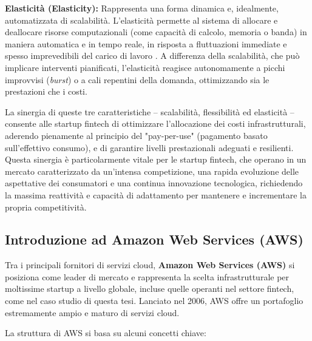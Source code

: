 \textbf{Elasticità (Elasticity):} Rappresenta una forma dinamica e, idealmente, automatizzata di scalabilità. L'elasticità permette al sistema di allocare e deallocare risorse computazionali (come capacità di calcolo, memoria o banda) in maniera automatica e in tempo reale, in risposta a fluttuazioni immediate e spesso imprevedibili del carico di lavoro \cite{cloudsurvey2019}. A differenza della scalabilità, che può implicare interventi pianificati, l'elasticità reagisce autonomamente a picchi improvvisi (\textit{burst}) o a cali repentini della domanda, ottimizzando sia le prestazioni che i costi.

La sinergia di queste tre caratteristiche – scalabilità, flessibilità ed elasticità – consente alle startup fintech di ottimizzare l'allocazione dei costi infrastrutturali, aderendo pienamente al principio del "pay-per-use" (pagamento basato sull'effettivo consumo), e di garantire livelli prestazionali adeguati e resilienti. Questa sinergia è particolarmente vitale per le startup fintech, che operano in un mercato caratterizzato da un'intensa competizione, una rapida evoluzione delle aspettative dei consumatori e una continua innovazione tecnologica, richiedendo la massima reattività e capacità di adattamento per mantenere e incrementare la propria competitività.

\subsection{Introduzione ad Amazon Web Services (AWS)}
\label{sec:aws-intro}

Tra i principali fornitori di servizi cloud, \textbf{Amazon Web Services (AWS)} si posiziona come leader di mercato e rappresenta la scelta infrastrutturale per moltissime startup a livello globale, incluse quelle operanti nel settore fintech, come nel caso studio di questa tesi. Lanciato nel 2006, AWS offre un portafoglio estremamente ampio e maturo di servizi cloud.

La struttura di AWS si basa su alcuni concetti chiave:

